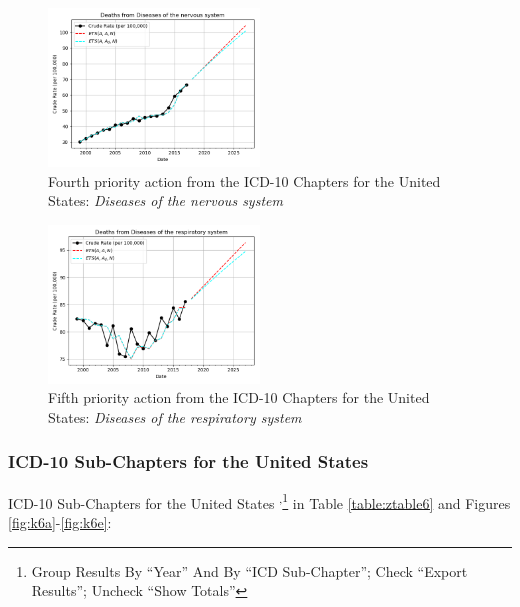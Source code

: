 \documentclass[10pt, a4paper, twocolumn]{IEEEconf}
\begin{document}
\begin{figure}[H]
  \centering
  \includegraphics[width=0.5\textwidth]{results/US_ICD10_CHAPTERS/Diseases_of_the_nervous_system_ets.png}
  \caption{Fourth priority action from the ICD-10 Chapters for the United States: \textit{Diseases of the nervous system}}\label{fig:k5d}
\end{figure}

\begin{figure}[H]
  \centering
  \includegraphics[width=0.5\textwidth]{results/US_ICD10_CHAPTERS/Diseases_of_the_respiratory_system_ets.png}
  \caption{Fifth priority action from the ICD-10 Chapters for the United States: \textit{Diseases of the respiratory system}}\label{fig:k5e}
\end{figure}

\clearpage

\subsubsection{ICD-10 Sub-Chapters for the United States}

ICD-10 Sub-Chapters for the United States \citep{centers2017underlying}\textsuperscript{,}\footnote{Group Results By \enquote{Year} And By \enquote{ICD Sub-Chapter}; Check \enquote{Export Results}; Uncheck \enquote{Show Totals}} in Table \ref{table:ztable6} and Figures \ref{fig:k6a}-\ref{fig:k6e}:
\end{document}
